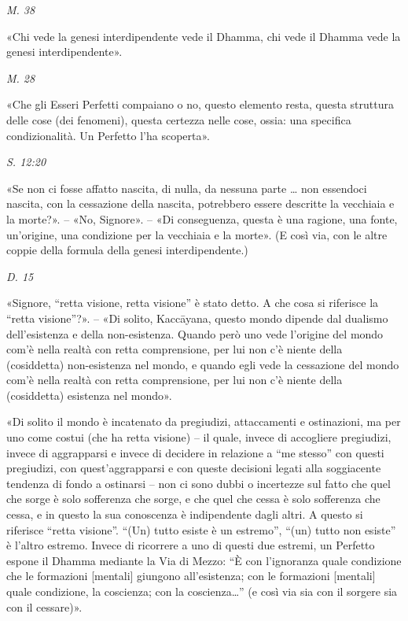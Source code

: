 \emph{M. 38}


«Chi vede la genesi interdipendente vede il Dhamma, chi vede il Dhamma
vede la genesi interdipendente».


\emph{M. 28}


«Che gli Esseri Perfetti compaiano o no, questo elemento resta, questa
struttura delle cose (dei fenomeni), questa certezza nelle cose, ossia:
una specifica condizionalità. Un Perfetto l’ha scoperta».


\emph{S. 12:20}


«Se non ci fosse affatto nascita, di nulla, da nessuna parte …​ non
essendoci nascita, con la cessazione della nascita, potrebbero essere
descritte la vecchiaia e la morte?». – «No, Signore». – «Di conseguenza,
questa è una ragione, una fonte, un’origine, una condizione per la
vecchiaia e la morte». (E così via, con le altre coppie della formula
della genesi interdipendente.)


\emph{D. 15}


«Signore, “retta visione, retta visione” è stato detto. A che cosa si
riferisce la “retta visione”?». – «Di solito, Kaccāyana, questo mondo
dipende dal dualismo dell’esistenza e della non-esistenza. Quando però
uno vede l’origine del mondo com’è nella realtà con retta comprensione,
per lui non c’è niente della (cosiddetta) non-esistenza nel mondo, e
quando egli vede la cessazione del mondo com’è nella realtà con retta
comprensione, per lui non c’è niente della (cosiddetta) esistenza nel
mondo».


«Di solito il mondo è incatenato da pregiudizi, attaccamenti e
ostinazioni, ma per uno come costui (che ha retta visione) – il quale,
invece di accogliere pregiudizi, invece di aggrapparsi e invece di
decidere in relazione a “me stesso” con questi pregiudizi, con
quest’aggrapparsi e con queste decisioni legati alla soggiacente
tendenza di fondo a ostinarsi – non ci sono dubbi o incertezze sul fatto
che quel che sorge è solo sofferenza che sorge, e che quel che cessa è
solo sofferenza che cessa, e in questo la sua conoscenza è indipendente
dagli altri. A questo si riferisce “retta visione”. “(Un) tutto esiste è
un estremo”, “(un) tutto non esiste” è l’altro estremo. Invece di
ricorrere a uno di questi due estremi, un Perfetto espone il Dhamma
mediante la Via di Mezzo: “È con l’ignoranza quale condizione che le
formazioni [mentali] giungono all’esistenza; con le formazioni [mentali]
quale condizione, la coscienza; con la coscienza…” (e così via sia con
il sorgere sia con il cessare)».


